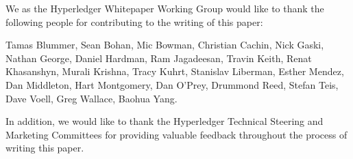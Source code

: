 We as the Hyperledger Whitepaper Working Group would like to thank the following people for contributing to the writing of this paper:

Tamas Blummer, Sean Bohan, Mic Bowman, Christian Cachin, Nick Gaski, Nathan George, Daniel Hardman, Ram Jagadeesan, Travin Keith, Renat Khasanshyn, Murali Krishna, Tracy Kuhrt, Stanislav Liberman, Esther Mendez, Dan Middleton, Hart Montgomery, Dan O'Prey, Drummond Reed, Stefan Teis, Dave Voell, Greg Wallace, Baohua Yang.

In addition, we would like to thank the Hyperledger Technical Steering and Marketing Committees for providing valuable feedback throughout the process of writing this paper.

